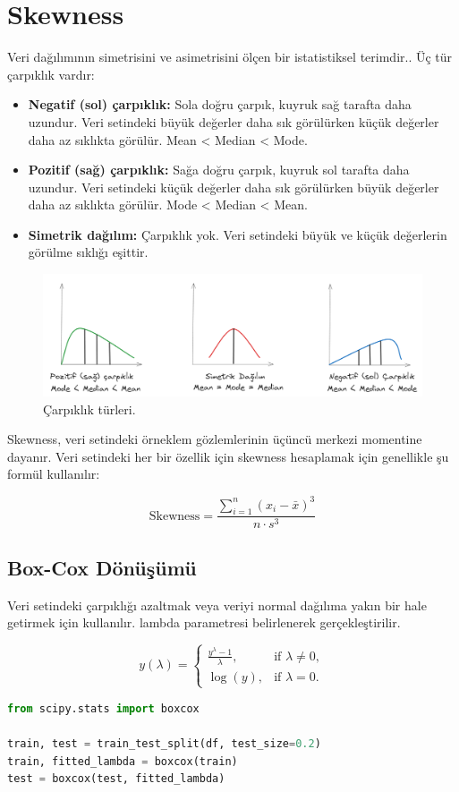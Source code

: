 \section{Skewness}
Veri dağılımının simetrisini ve asimetrisini ölçen bir istatistiksel terimdir.. Üç tür çarpıklık vardır:

\begin{itemize}
    \item \textbf{Negatif (sol) çarpıklık:} Sola doğru çarpık, kuyruk sağ tarafta daha uzundur. Veri setindeki büyük değerler daha sık görülürken küçük değerler daha az sıklıkta görülür. Mean < Median < Mode.
    \item \textbf{Pozitif (sağ) çarpıklık:} Sağa doğru çarpık, kuyruk sol tarafta daha uzundur. Veri setindeki küçük değerler daha sık görülürken büyük değerler daha az sıklıkta görülür. Mode < Median < Mean.
    \item \textbf{Simetrik dağılım:} Çarpıklık yok. Veri setindeki büyük ve küçük değerlerin görülme sıklığı eşittir.
\end{itemize}

\begin{figure}[h]
    \centering
    \includegraphics[width=1\textwidth]{images/skewness_types.png}
    \caption{Çarpıklık türleri.}
    \label{fig:enter-label}
\end{figure}

Skewness, veri setindeki örneklem gözlemlerinin üçüncü merkezi momentine dayanır. Veri setindeki her bir özellik için skewness hesaplamak için genellikle şu formül kullanılır:

\[\text{Skewness} = \frac{\sum_{i=1}^{n} (x_i - \bar{x})^3}{n \cdot s^3}\]



\subsection{Box-Cox Dönüşümü}
Veri setindeki çarpıklığı azaltmak veya veriyi normal dağılıma yakın bir hale getirmek için kullanılır. lambda parametresi belirlenerek gerçekleştirilir.

\[y(\lambda) = \begin{cases} \frac{{y^\lambda - 1}}{{\lambda}}, & \text{if } \lambda \neq 0, \\ \log(y), & \text{if } \lambda = 0. \end{cases}\]

\begin{lstlisting}[language=Python]
from scipy.stats import boxcox

train, test = train_test_split(df, test_size=0.2)
train, fitted_lambda = boxcox(train)
test = boxcox(test, fitted_lambda)
\end{lstlisting}

\newpage